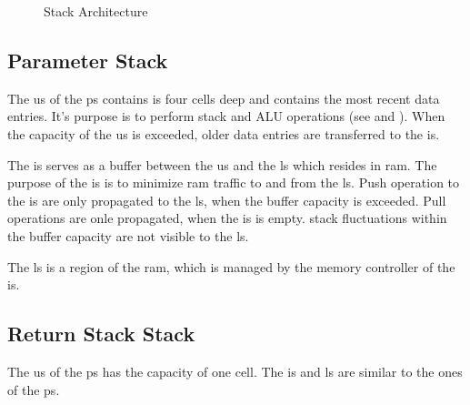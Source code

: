 \begin{figure}[!h]
\begin{center}
{{
    }
  }
  \caption{Stack Architecture}
  \label{stacks:fig}
  \end{center}
\end{figure}

\subsection{Parameter Stack}
\label{stacks:ps}

The \gls{us} of the \gls{ps} contains is four \glspl{cell} deep and contains the
most recent data entries. It's purpose is to perform stack and ALU operations
(see  and ).
When the capacity of the \gls{us} is exceeded, older data entries are transferred
to the \gls{is}.

The \gls{is} serves as a buffer between the \gls{us} and the \gls{ls} which resides
in \gls{ram}. The purpose of the \gls{is} is to minimize \gls{ram} traffic to and
from the \gls{ls}.
Push operation to the \gls{is} are only propagated to the \gls{ls}, when the buffer
capacity is exceeded. Pull operations are onle propagated, when the \gls{is} is empty.
\Gls{stack} fluctuations within the buffer capacity are not visible to the \gls{ls}.

The \gls{ls} is a region of the \gls{ram}, which is managed by the memory controller
of the \gls{is}.

\subsection{Return Stack Stack}
\label{stacks:ps}

The \gls{us} of the \gls{ps} has the capacity of one \gls{cell}. The \gls{is} and
\gls{ls} are similar to the ones of the \gls{ps}.
